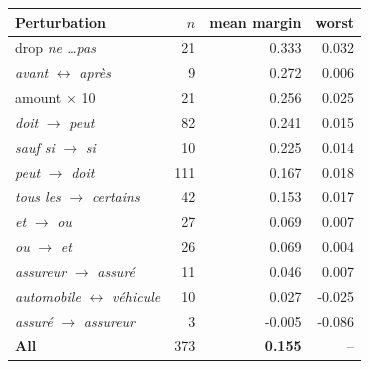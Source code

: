 \setlength{\tabcolsep}{4pt}
\begin{tabular}{lrrr}
\toprule
Perturbation & $n$ & mean margin & worst \\
\midrule
drop \emph{ne \dots pas} & 21 & 0.333 & 0.032 \\
\emph{avant} $\leftrightarrow$ \emph{apr\`es} & 9 & 0.272 & 0.006 \\
amount $\times$ 10 & 21 & 0.256 & 0.025 \\
\emph{doit} $\rightarrow$ \emph{peut} & 82 & 0.241 & 0.015 \\
\emph{sauf si} $\rightarrow$ \emph{si} & 10 & 0.225 & 0.014 \\
\emph{peut} $\rightarrow$ \emph{doit} & 111 & 0.167 & 0.018 \\
\emph{tous les} $\rightarrow$ \emph{certains} & 42 & 0.153 & 0.017 \\
\emph{et} $\rightarrow$ \emph{ou} & 27 & 0.069 & 0.007 \\
\emph{ou} $\rightarrow$ \emph{et} & 26 & 0.069 & 0.004 \\
\emph{assureur} $\rightarrow$ \emph{assur\'e} & 11 & 0.046 & 0.007 \\
\emph{automobile} $\leftrightarrow$ \emph{v\'ehicule} & 10 & 0.027 & -0.025 \\
\emph{assur\'e} $\rightarrow$ \emph{assureur} & 3 & -0.005 & -0.086 \\
\midrule
\textbf{All} & 373 & \textbf{0.155} & -- \\
\bottomrule
\end{tabular}